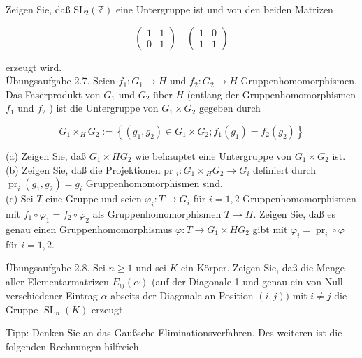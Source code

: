 \documentclass[10pt, letterpaper]{article}
\begin{document}
Zeigen Sie, daß $\mathrm{SL}_{2}(\mathbb{Z})$ eine Untergruppe ist und von den beiden Matrizen

$$
\left(\begin{array}{ll}
1 & 1 \\
0 & 1
\end{array}\right) \quad\left(\begin{array}{ll}
1 & 0 \\
1 & 1
\end{array}\right)
$$

erzeugt wird.\\
Übungsaufgabe 2.7. Seien $f_{1}: G_{1} \rightarrow H$ und $f_{2}: G_{2} \rightarrow H$ Gruppenhomomorphismen. Das Faserprodukt von $G_{1}$ und $G_{2}$ über $H$ (entlang der Gruppenhomomorphismen $f_{1}$ und $f_{2}$ ) ist die Untergruppe von $G_{1} \times G_{2}$ gegeben durch

$$
G_{1} \times_{H} G_{2}:=\left\{\left(g_{1}, g_{2}\right) \in G_{1} \times G_{2} ; f_{1}\left(g_{1}\right)=f_{2}\left(g_{2}\right)\right\}
$$

(a) Zeigen Sie, daß $G_{1} \times H G_{2}$ wie behauptet eine Untergruppe von $G_{1} \times G_{2}$ ist.\\
(b) Zeigen Sie, daß die Projektionen pr ${ }_{i}: G_{1} \times{ }_{H} G_{2} \rightarrow G_{i}$ definiert durch $\operatorname{pr}_{i}\left(g_{1}, g_{2}\right)=g_{i}$ Gruppenhomomorphismen sind.\\
(c) Sei $T$ eine Gruppe und seien $\varphi_{i}: T \rightarrow G_{i}$ für $i=1,2$ Gruppenhomomorphismen mit $f_{1} \circ \varphi_{1}=f_{2} \circ \varphi_{2}$ als Gruppenhomomorphismen $T \rightarrow H$. Zeigen Sie, daß es genau einen Gruppenhomomorphismus $\varphi: T \rightarrow G_{1} \times H G_{2}$ gibt mit $\varphi_{i}=\operatorname{pr}_{i} \circ \varphi$ für $i=1,2$.

Übungsaufgabe 2.8. Sei $n \geq 1$ und sei $K$ ein Körper. Zeigen Sie, daß die Menge aller Elementarmatrizen $E_{i j}(\alpha)$ (auf der Diagonale 1 und genau ein von Null verschiedener Eintrag $\alpha$ abseits der Diagonale an Position $(i, j))$ mit $i \neq j$ die Gruppe $\operatorname{SL}_{n}(K)$ erzeugt.

Tipp: Denken Sie an das Gaußsche Eliminationsverfahren. Des weiteren ist die folgenden Rechnungen hilfreich
\end{document}
